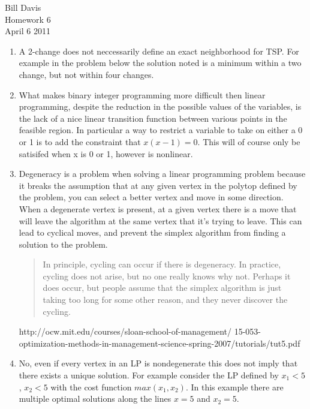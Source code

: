\documentclass[11pt,fleqn]{article}
\begin{document}
\newcommand{\mbf}[1]{\mbox{{\bfseries #1}}}
\newcommand{\N}{\mbf{N}}
\renewcommand{\O}{\mbf{O}}

\noindent Bill Davis \\
Homework 6 \\
April 6 2011

\begin{enumerate}

\item
A 2-change does not neccessarily define an exact neighborhood for TSP. For example in the problem below the solution noted is a minimum within a two change, but not within four changes. 

\item
What makes binary integer programming more difficult then linear programming, despite the reduction in the possible values of the variables, is the lack of a nice linear transition function between various points in the feasible region. In particular a way to restrict a variable to take on either a 0 or 1 is to add the constraint that $ x(x-1) = 0$. This will of course only be satisifed when x is 0 or 1, however is nonlinear. 

\item 
Degeneracy is a problem when solving a linear programming problem because it breaks the assumption that at any given vertex in the polytop defined by the problem, you can select a better vertex and move in some direction. When a degenerate vertex is present, at a given vertex there is a move that will leave the algorithm at the same vertex that it's trying to leave. This can lead to cyclical moves, and prevent the simplex algorithm from finding a solution to the problem. 

\begin{quote}
In principle, cycling can occur if there is degeneracy.  In practice,  cycling does not arise, 
but no one really knows why not.  Perhaps it  
does occur, but people assume that the simplex algorithm is just
taking too long for some other reason, and they never discover the 
cycling.
\end{quote}

http://ocw.mit.edu/courses/sloan-school-of-management/
15-053-optimization-methods-in-management-science-spring-2007/tutorials/tut5.pdf

\item
No, even if every vertex in an LP is nondegenerate this does not imply that there exists a unique solution. For example consider the LP defined by $x_1<5$, $x_2<5$ with the cost function $max(x_1,x_2)$. In this example there are multiple optimal solutions along the lines $x=5$ and $x_2=5$. 


\end{enumerate}
\end{document}

